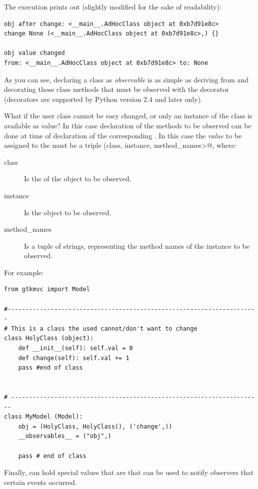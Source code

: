 The execution prints out (slightly modified for the sake of
readability):

{ \codesize 
\begin{verbatim} 
obj after change: <__main__.AdHocClass object at 0xb7d91e8c> 
change None (<__main__.AdHocClass object at 0xb7d91e8c>,) {}

obj value changed 
from: <__main__.AdHocClass object at 0xb7d91e8c> to: None
\end{verbatim}
}

As you can see, declaring a class as \emph{observable} is as simple as
deriving from  and decorating
those class methods that must be observed with the decorator 
 (decorators are supported by
Python version 2.4 and later only). 

\vspace{4mm}
What if the user class cannot be easy changed, or only an instance of
the class is available as \OP value? In this case declaration of the
methods to be observed can be done at time of declaration of the
corresponding \OP. In this case the \emph{value} to be assigned to the
\OP must be a triple \verb@(class, instance, method_names>@, where:
\begin{description}
\item[class] Is the  of the object to be observed.
\item[instance] Is the object to be observed.
\item[method\_names] Is a tuple of strings, representing the method
  names of the instance to be observed.
\end{description}

For example:
{ \codesize 
\begin{verbatim} 
from gtkmvc import Model

#----------------------------------------------------------------------
# This is a class the used cannot/don't want to change
class HolyClass (object):    
    def __init__(self): self.val = 0 
    def change(self): self.val += 1
    pass #end of class


# ----------------------------------------------------------------------
class MyModel (Model):
    obj = (HolyClass, HolyClass(), ('change',))
    __observables__ = ("obj",)

    pass # end of class
\end{verbatim}
}



\vspace{4mm}
Finally, \OP can hold special values that are  that can be
used to notify observers that certain events occurred. 


